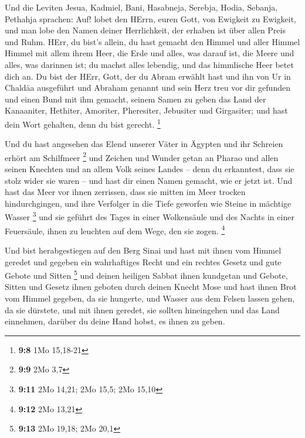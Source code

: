  Und die Leviten Jesua, Kadmiel, Bani, Hasabneja, Serebja,
Hodia, Sebanja, Pethahja sprachen: Auf! lobet den HErrn, euren Gott, von
Ewigkeit zu Ewigkeit, und man lobe den Namen deiner Herrlichkeit, der
erhaben ist über allen Preis und Ruhm.  HErr, du bist's
allein, du hast gemacht den Himmel und aller Himmel Himmel mit allem
ihrem Heer, die Erde und alles, was darauf ist, die Meere und alles, was
darinnen ist; du machst alles lebendig, und das himmlische Heer betet
dich an.  Du bist der HErr, Gott, der du Abram erwählt
hast und ihn von Ur in Chaldäa ausgeführt und Abraham genannt
 und sein Herz treu vor dir gefunden und einen Bund mit
ihm gemacht, seinem Samen zu geben das Land der Kanaaniter, Hethiter,
Amoriter, Pheresiter, Jebusiter und Girgasiter; und hast dein Wort
gehalten, denn du bist gerecht. \footnote{\textbf{9:8} 1Mo 15,18-21}

 Und du hast angesehen das Elend unserer Väter in Ägypten
und ihr Schreien erhört am Schilfmeer \footnote{\textbf{9:9} 2Mo 3,7}
 und Zeichen und Wunder getan an Pharao und allen seinen
Knechten und an allem Volk seines Landes -- denn du erkanntest, dass sie
stolz wider sie waren -- und hast dir einen Namen gemacht, wie er jetzt
ist.  Und hast das Meer vor ihnen zerrissen, dass sie
mitten im Meer trocken hindurchgingen, und ihre Verfolger in die Tiefe
geworfen wie Steine in mächtige Wasser \footnote{\textbf{9:11} 2Mo
  14,21; 2Mo 15,5; 2Mo 15,10}  und sie geführt des Tages
in einer Wolkensäule und des Nachts in einer Feuersäule, ihnen zu
leuchten auf dem Wege, den sie zogen. \footnote{\textbf{9:12} 2Mo 13,21}

 Und bist herabgestiegen auf den Berg Sinai und hast mit
ihnen vom Himmel geredet und gegeben ein wahrhaftiges Recht und ein
rechtes Gesetz und gute Gebote und Sitten \footnote{\textbf{9:13} 2Mo
  19,18; 2Mo 20,1}  und deinen heiligen Sabbat ihnen
kundgetan und Gebote, Sitten und Gesetz ihnen geboten durch deinen
Knecht Mose  und hast ihnen Brot vom Himmel gegeben, da
sie hungerte, und Wasser aus dem Felsen lassen gehen, da sie dürstete,
und mit ihnen geredet, sie sollten hineingehen und das Land einnehmen,
darüber du deine Hand hobst, es ihnen zu geben.


